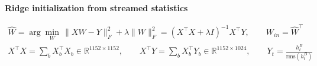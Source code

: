\documentclass[border=40pt]{standalone}
\begin{document}
\begin{minipage}{26cm}
{\sffamily\bfseries\Large\color{muted} Ridge initialization from streamed statistics}\par\vspace{-14pt}
{\LARGE
\begin{gather*}
\hat W = \arg\min_{W}\,\lVert XW - Y\rVert_F^{2} + \lambda\lVert W\rVert_F^{2} = (X^{\top}X + \lambda I)^{-1}X^{\top}Y,
\qquad W_{in} = \hat W^{\top}
\\[6pt]
X^{\top}X = \sum_{b} X_b^{\top}X_b \in \mathbb{R}^{1152\times1152}, \qquad X^{\top}Y = \sum_{b} X_b^{\top}Y_b \in \mathbb{R}^{1152\times1024},
\qquad Y_t = \frac{h^{B}_t}{\mathrm{rms}(h^{B}_t)}
\end{gather*}}
\end{minipage}
\end{document}
